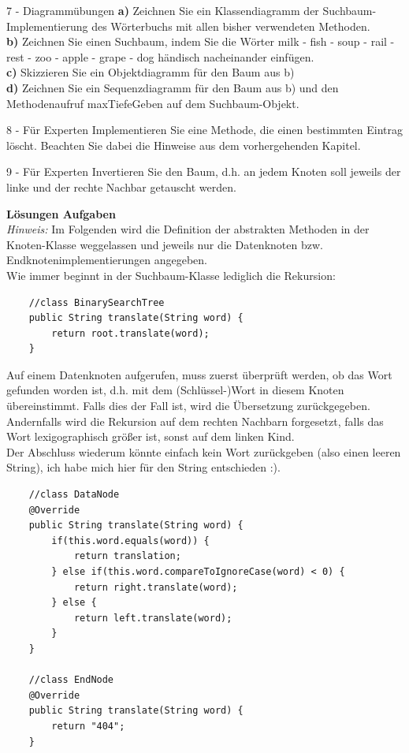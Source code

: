 \documentclass{article}
\begin{document}
\begin{task}{7 - Diagrammübungen}
\textbf{a) } Zeichnen Sie ein Klassendiagramm der Suchbaum-Implementierung des Wörterbuchs mit allen bisher verwendeten Methoden. \\
\textbf{b)} Zeichnen Sie einen Suchbaum, indem Sie die Wörter milk - fish - soup - rail - rest - zoo - apple - grape - dog händisch nacheinander einfügen. \\ 
\textbf{c)} Skizzieren Sie  ein Objektdiagramm für den Baum aus b) \\
\textbf{d)} Zeichnen Sie ein Sequenzdiagramm für den Baum aus b) und den Methodenaufruf maxTiefeGeben auf dem Suchbaum-Objekt. 
\end{task}

\begin{task}{8 - Für Experten}
Implementieren Sie eine Methode, die einen bestimmten Eintrag löscht. Beachten Sie dabei die Hinweise aus dem vorhergehenden Kapitel. 
\end{task}

\begin{task}{9 - Für Experten}
Invertieren Sie den Baum, d.h. an jedem Knoten soll jeweils der linke und der rechte Nachbar getauscht werden. 
\end{task}



\newpage 

\textbf{Lösungen Aufgaben} \\
\textit{Hinweis:} Im Folgenden wird die Definition der abstrakten Methoden in der Knoten-Klasse weggelassen und jeweils nur die Datenknoten bzw. Endknotenimplementierungen angegeben. \\
Wie immer beginnt in der Suchbaum-Klasse lediglich die Rekursion:
\begin{verbatim}
    //class BinarySearchTree
    public String translate(String word) {
        return root.translate(word);
    }
\end{verbatim}
Auf einem Datenknoten aufgerufen, muss zuerst überprüft werden, ob das Wort gefunden worden ist, d.h. mit dem (Schlüssel-)Wort in diesem Knoten übereinstimmt. Falls dies der Fall ist, wird die Übersetzung zurückgegeben. Andernfalls wird die Rekursion auf dem rechten Nachbarn forgesetzt, falls das Wort lexigographisch größer ist, sonst auf dem linken Kind. \\
Der Abschluss wiederum könnte einfach kein Wort zurückgeben (also einen leeren String), ich habe mich hier für den String  entschieden :).
\begin{verbatim}
    //class DataNode 
    @Override
    public String translate(String word) {
        if(this.word.equals(word)) {
            return translation;
        } else if(this.word.compareToIgnoreCase(word) < 0) {
            return right.translate(word);
        } else {
            return left.translate(word);
        }
    }

    //class EndNode 
    @Override
    public String translate(String word) {
        return "404";
    }
\end{verbatim}
\end{document}
